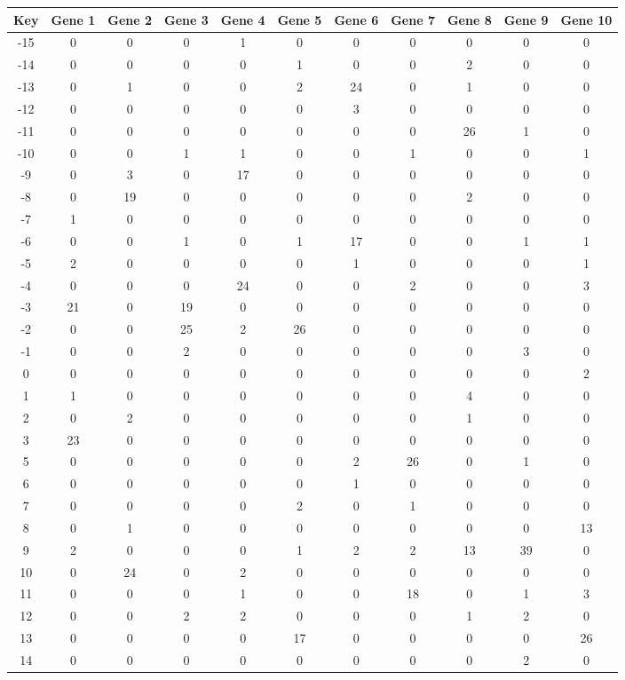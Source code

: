 \begin{tabular}{|c|c|c|c|c|c|c|c|c|c|c|}
\hline
Key & Gene 1 & Gene 2 & Gene 3 & Gene 4 & Gene 5 & Gene 6 & Gene 7 & Gene 8 & Gene 9 & Gene 10 \\
\hline
-15 & 0 & 0 & 0 & 1 & 0 & 0 & 0 & 0 & 0 & 0 \\
-14 & 0 & 0 & 0 & 0 & 1 & 0 & 0 & 2 & 0 & 0 \\
-13 & 0 & 1 & 0 & 0 & 2 & 24 & 0 & 1 & 0 & 0 \\
-12 & 0 & 0 & 0 & 0 & 0 & 3 & 0 & 0 & 0 & 0 \\
-11 & 0 & 0 & 0 & 0 & 0 & 0 & 0 & 26 & 1 & 0 \\
-10 & 0 & 0 & 1 & 1 & 0 & 0 & 1 & 0 & 0 & 1 \\
-9 & 0 & 3 & 0 & 17 & 0 & 0 & 0 & 0 & 0 & 0 \\
-8 & 0 & 19 & 0 & 0 & 0 & 0 & 0 & 2 & 0 & 0 \\
-7 & 1 & 0 & 0 & 0 & 0 & 0 & 0 & 0 & 0 & 0 \\
-6 & 0 & 0 & 1 & 0 & 1 & 17 & 0 & 0 & 1 & 1 \\
-5 & 2 & 0 & 0 & 0 & 0 & 1 & 0 & 0 & 0 & 1 \\
-4 & 0 & 0 & 0 & 24 & 0 & 0 & 2 & 0 & 0 & 3 \\
-3 & 21 & 0 & 19 & 0 & 0 & 0 & 0 & 0 & 0 & 0 \\
-2 & 0 & 0 & 25 & 2 & 26 & 0 & 0 & 0 & 0 & 0 \\
-1 & 0 & 0 & 2 & 0 & 0 & 0 & 0 & 0 & 3 & 0 \\
0 & 0 & 0 & 0 & 0 & 0 & 0 & 0 & 0 & 0 & 2 \\
1 & 1 & 0 & 0 & 0 & 0 & 0 & 0 & 4 & 0 & 0 \\
2 & 0 & 2 & 0 & 0 & 0 & 0 & 0 & 1 & 0 & 0 \\
3 & 23 & 0 & 0 & 0 & 0 & 0 & 0 & 0 & 0 & 0 \\
5 & 0 & 0 & 0 & 0 & 0 & 2 & 26 & 0 & 1 & 0 \\
6 & 0 & 0 & 0 & 0 & 0 & 1 & 0 & 0 & 0 & 0 \\
7 & 0 & 0 & 0 & 0 & 2 & 0 & 1 & 0 & 0 & 0 \\
8 & 0 & 1 & 0 & 0 & 0 & 0 & 0 & 0 & 0 & 13 \\
9 & 2 & 0 & 0 & 0 & 1 & 2 & 2 & 13 & 39 & 0 \\
10 & 0 & 24 & 0 & 2 & 0 & 0 & 0 & 0 & 0 & 0 \\
11 & 0 & 0 & 0 & 1 & 0 & 0 & 18 & 0 & 1 & 3 \\
12 & 0 & 0 & 2 & 2 & 0 & 0 & 0 & 1 & 2 & 0 \\
13 & 0 & 0 & 0 & 0 & 17 & 0 & 0 & 0 & 0 & 26 \\
14 & 0 & 0 & 0 & 0 & 0 & 0 & 0 & 0 & 2 & 0 \\
\hline
\end{tabular}